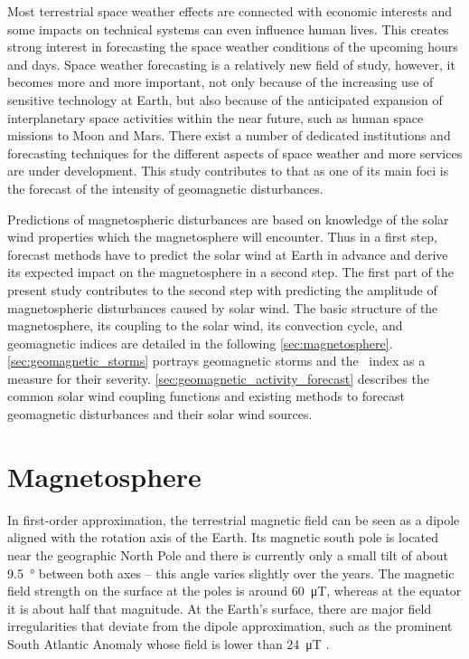 Most terrestrial space weather effects are connected with economic interests and some impacts on technical systems can even influence human lives. This creates strong interest in forecasting the space weather conditions of the upcoming hours and days. Space weather forecasting is a relatively new field of study, however, it becomes more and more important, not only because of the increasing use of sensitive technology at Earth, but also because of the anticipated expansion of interplanetary space activities within the near future, such as human space missions to Moon and Mars. There exist a number of dedicated institutions and forecasting techniques for the different aspects of space weather and more services are under development. This study contributes to that as one of its main foci is the forecast of the intensity of geomagnetic disturbances.

Predictions of magnetospheric disturbances are based on knowledge of the solar wind properties which the magnetosphere will encounter. Thus in a first step, forecast methods have to predict the solar wind at Earth in advance and derive its expected impact on the magnetosphere in a second step. The first part of the present study contributes to the second step with predicting the amplitude of magnetospheric disturbances caused by solar wind. The basic structure of the magnetosphere, its coupling to the solar wind, its convection cycle, and geomagnetic indices are detailed in the following \autoref{sec:magnetosphere}. \autoref{sec:geomagnetic_storms} portrays geomagnetic storms and the \Kp~index as a measure for their severity. \autoref{sec:geomagnetic_activity_forecast} describes the common solar wind coupling functions and existing methods to forecast geomagnetic disturbances and their solar wind sources.


\section{Magnetosphere}
\label{sec:magnetosphere}
In first-order approximation, the terrestrial magnetic field can be seen as a dipole aligned with the rotation axis of the Earth. Its magnetic south pole is located near the geographic North Pole and there is currently only a small tilt of about \SI{9.5}{\degree} between both axes \citep{Thebault2015} -- this angle varies slightly over the years. The magnetic field strength on the surface at the poles is around \SI{60}{\micro\tesla}, whereas at the equator it is about half that magnitude. At the Earth's surface, there are major field irregularities that deviate from the dipole approximation, such as the prominent South Atlantic Anomaly whose field is lower than \SI{24}{\micro\tesla} \citep{Thebault2015}.

